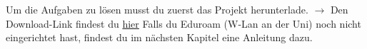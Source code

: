 
\label{ex1}
Um die Aufgaben zu lösen musst du zuerst das Projekt herunterlade.\newline
$\rightarrow$ Den Download-Link findest du \href{\jvkpackageurl}{hier}\newline
Falls du Eduroam (W-Lan an der Uni) noch nicht eingerichtet hast, findest du im nächsten Kapitel eine Anleitung dazu.